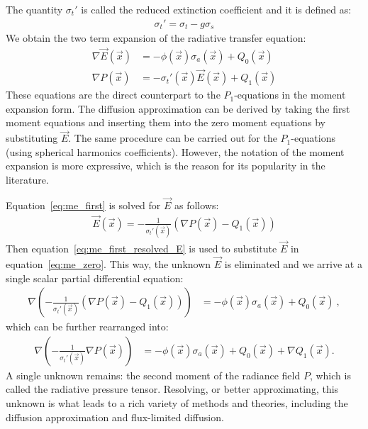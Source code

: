 The quantity $\sigma_t'$ is called the reduced extinction coefficient and it is defined as:
\begin{align*}
\sigma_t' = \sigma_t - g\sigma_s
\end{align*}
We obtain the two term expansion of the radiative transfer equation:
\begin{align}
\label{eq:me_zero}
\nabla\vec{E}\left(\vec{x}\right)&=
-\phi(\vec{x})\sigma_a(\vec{x})
+Q_0\left(\vec{x}\right)
\\
\label{eq:me_first}
\nabla P\left(\vec{x}\right) &= -\sigma_t'(\vec{x})\vec{E}\left(\vec{x}\right)
+Q_1\left(\vec{x}\right)
\end{align}
These equations are the direct counterpart to the $P_1$-equations in the moment expansion form. The diffusion approximation can be derived by taking the first moment equations and inserting them into the zero moment equations by substituting $\vec{E}$. The same procedure can be carried out for the $P_1$-equations (using spherical harmonics coefficients). However, the notation of the moment expansion is more expressive, which is the reason for its popularity in the literature.

Equation~\ref{eq:me_first} is solved for $\vec{E}$ as follows:
\begin{align}
\label{eq:me_first_resolved_E}
\vec{E}\left(\vec{x}\right) =
-\frac{1}{\sigma_t'\left(\vec{x}\right)}
\left(
\nabla P\left(\vec{x}\right)
-Q_1\left(\vec{x}\right)
\right)
\end{align}
Then equation~\ref{eq:me_first_resolved_E} is used to substitute $\vec{E}$ in equation~\ref{eq:me_zero}. This way, the unknown $\vec{E}$ is eliminated and we arrive at a single scalar partial differential equation:
\begin{align}
\nabla
\left(
-\frac{1}{\sigma_t'\left(\vec{x}\right)}
\left(
\nabla P\left(\vec{x}\right)
-Q_1\left(\vec{x}\right)
\right)
\right)&=
-\phi(\vec{x})\sigma_a(\vec{x})
+Q_0\left(\vec{x}\right)
\ ,
\end{align}
which can be further rearranged into:
\begin{align}
\label{eq:general_diffusion_equation}
\nabla
\left(
-\frac{1}{\sigma_t'\left(\vec{x}\right)}
\nabla P\left(\vec{x}\right)
\right)&=
-\phi(\vec{x})\sigma_a(\vec{x})
+Q_0\left(\vec{x}\right)
+\nabla Q_1\left(\vec{x}\right)
.
\end{align}
A single unknown remains: the second moment of the radiance field $P$, which is called the radiative pressure tensor. Resolving, or better approximating, this unknown is what leads to a rich variety of methods and theories, including the diffusion approximation and flux-limited diffusion.

